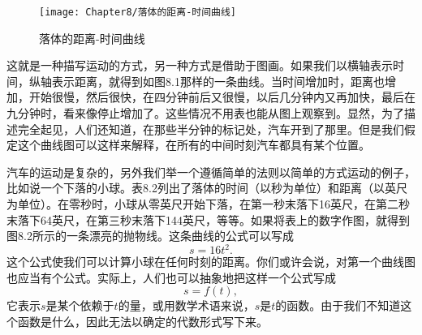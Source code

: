 \label{tab:表8.2}
\noindent
\begin{minipage}{\textwidth}
\begin{minipage}{0.3\textwidth}
\begin{table}[H]
    \centering
    \medskip 
    \caption*{表 8.2}
\end{table}
\end{minipage}\hfill
    \begin{minipage}{0.7\textwidth}
        \begin{figure}[H]
            \centering
            \texttt{[image: Chapter8/落体的距离-时间曲线]}
            \caption{落体的距离-时间曲线}
            \label{figure:落体的距离-时间曲线}
        \end{figure}
    \end{minipage} 
\end{minipage} 

这就是一种描写运动的方式，另一种方式是借助于图画。如果我们以横轴表示时间，纵轴表示距离，就得到如图8.1那样的一条曲线。当时间增加时，距离也增加，开始很慢，然后很快，在四分钟前后又很慢，以后几分钟内又再加快，最后在九分钟时，看来像停止增加了。这些情况不用表也能从图上观察到。显然，为了描述完全起见，人们还知道，在那些半分钟的标记处，汽车开到了那里。但是我们假定这个曲线图可以这样来解释，在所有的中间时刻汽车都具有某个位置。

汽车的运动是复杂的，另外我们举一个遵循简单的法则以简单的方式运动的例子，比如说一个下落的小球。表8.2列出了落体的时间（以秒为单位）和距离（以英尺为单位）。在零秒时，小球从零英尺开始下落，在第一秒末落下16英尺，在第二秒末落下64英尺，在第三秒末落下144英尺，等等。如果将表上的数字作图，就得到图8.2所示的一条漂亮的抛物线。这条曲线的公式可以写成
\begin{equation}
\label{Eq:I:8:1}
s=16t^2.
\end{equation}
这个公式使我们可以计算小球在任何时刻的距离。你们或许会说，对第一个曲线图也应当有个公式。实际上，人们也可以抽象地把这样一个公式写成
\begin{equation}
\label{Eq:I:8:2}
s=f(t),
\end{equation}
它表示$s$是某个依赖于$t$的量，或用数学术语来说，$s$是$t$的函数。由于我们不知道这个函数是什么，因此无法以确定的代数形式写下来。

